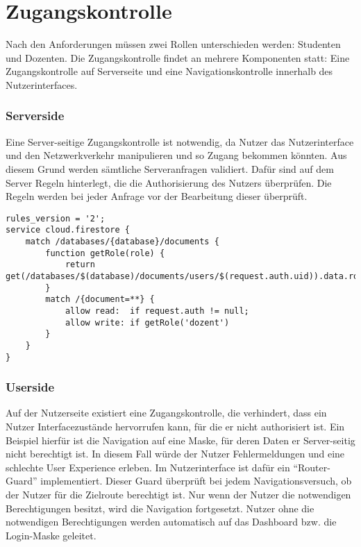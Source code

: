 \section{Zugangskontrolle}
Nach den Anforderungen müssen zwei Rollen unterschieden werden: Studenten und Dozenten.
Die Zugangskontrolle findet an mehrere Komponenten statt: Eine Zugangskontrolle auf Serverseite und eine Navigationskontrolle innerhalb des Nutzerinterfaces.


\subsubsection*{Serverside}
Eine Server-seitige Zugangskontrolle ist notwendig, da Nutzer das Nutzerinterface und den Netzwerkverkehr manipulieren und so Zugang bekommen könnten.
Aus diesem Grund werden sämtliche Serveranfragen validiert.
Dafür sind auf dem Server Regeln hinterlegt, die die Authorisierung des Nutzers überprüfen.
Die Regeln werden bei jeder Anfrage vor der Bearbeitung dieser überprüft.

\begin{lstlisting}[caption={Einfaches Beispiel der Serverside Regeln}, label=lst:firestoreRules]
rules_version = '2';
service cloud.firestore {
    match /databases/{database}/documents {
        function getRole(role) {
            return get(/databases/$(database)/documents/users/$(request.auth.uid)).data.roles[role]
        }
        match /{document=**} {
            allow read:  if request.auth != null;
            allow write: if getRole('dozent')
        }
    }
}\end{lstlisting}


\subsubsection*{Userside}
Auf der Nutzerseite existiert eine Zugangskontrolle, die verhindert, dass ein Nutzer Interfacezustände hervorrufen kann, für die er nicht authorisiert ist.
Ein Beispiel hierfür ist die Navigation auf eine Maske, für deren Daten er Server-seitig nicht berechtigt ist.
In diesem Fall würde der Nutzer Fehlermeldungen und eine schlechte User Experience erleben.
Im Nutzerinterface ist dafür ein \enquote{Router-Guard} implementiert.
Dieser Guard überprüft bei jedem Navigationsversuch, ob der Nutzer für die Zielroute berechtigt ist.
Nur wenn der Nutzer die notwendigen Berechtigungen besitzt, wird die Navigation fortgesetzt.
Nutzer ohne die notwendigen Berechtigungen werden automatisch auf das Dashboard bzw. die Login-Maske geleitet.


